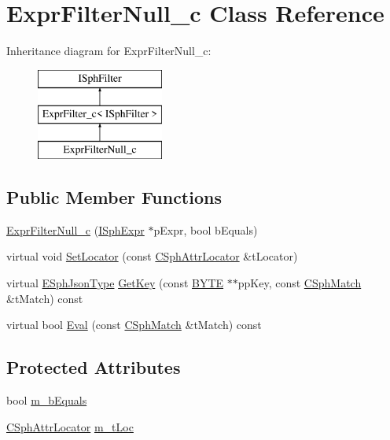 \hypertarget{classExprFilterNull__c}{\section{Expr\-Filter\-Null\-\_\-c Class Reference}
\label{classExprFilterNull__c}
}
Inheritance diagram for Expr\-Filter\-Null\-\_\-c\-:\begin{figure}[H]
\begin{center}
\leavevmode
\includegraphics[height=3.000000cm]{classExprFilterNull__c}
\end{center}
\end{figure}
\subsection*{Public Member Functions}
\begin{DoxyCompactItemize}
\item 
\hyperlink{classExprFilterNull__c_ae29dfead369db9496efadcdbdd850d9f}{Expr\-Filter\-Null\-\_\-c} (\hyperlink{structISphExpr}{I\-Sph\-Expr} $\ast$p\-Expr, bool b\-Equals)
\item 
virtual void \hyperlink{classExprFilterNull__c_a5eda15ddd36baec38a93b5680fae025e}{Set\-Locator} (const \hyperlink{structCSphAttrLocator}{C\-Sph\-Attr\-Locator} \&t\-Locator)
\item 
virtual \hyperlink{sphinxjson_8h_ad0338b1aabded682906629a3e477a2a8}{E\-Sph\-Json\-Type} \hyperlink{classExprFilterNull__c_a516d43ec23e026e247f5e74ca61b0fb9}{Get\-Key} (const \hyperlink{sphinxstd_8h_a4ae1dab0fb4b072a66584546209e7d58}{B\-Y\-T\-E} $\ast$$\ast$pp\-Key, const \hyperlink{classCSphMatch}{C\-Sph\-Match} \&t\-Match) const 
\item 
virtual bool \hyperlink{classExprFilterNull__c_aad0e612f5470111ad21e0cf9f0e00c11}{Eval} (const \hyperlink{classCSphMatch}{C\-Sph\-Match} \&t\-Match) const 
\end{DoxyCompactItemize}
\subsection*{Protected Attributes}
\begin{DoxyCompactItemize}
\item 
bool \hyperlink{classExprFilterNull__c_ab25c95a16fd5321a9b49168255dd18e5}{m\-\_\-b\-Equals}
\item 
\hyperlink{structCSphAttrLocator}{C\-Sph\-Attr\-Locator} \hyperlink{classExprFilterNull__c_aab49a47ba5710a473af1cf3a4d4abc9a}{m\-\_\-t\-Loc}
\end{DoxyCompactItemize}


